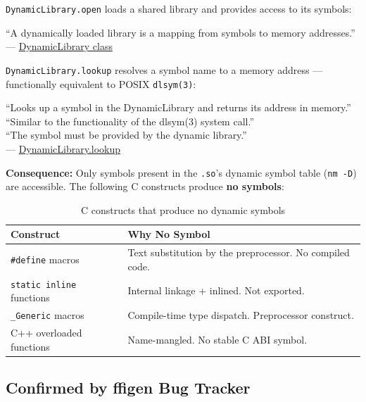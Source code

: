 \documentclass[11pt,a4paper]{article}
\newcommand{\code}[1]{\texttt{#1}}
\begin{document}
\code{DynamicLibrary.open} loads a shared library and provides access to its
symbols:

\begin{quotebox}
``A dynamically loaded library is a mapping from symbols to memory addresses.''\\
--- \href{https://api.dart.dev/stable/latest/dart-ffi/DynamicLibrary-class.html}{DynamicLibrary class}
\end{quotebox}

\code{DynamicLibrary.lookup} resolves a symbol name to a memory address ---
functionally equivalent to POSIX \code{dlsym(3)}:

\begin{quotebox}
``Looks up a symbol in the DynamicLibrary and returns its address in memory.''\\
``Similar to the functionality of the dlsym(3) system call.''\\
``The symbol must be provided by the dynamic library.''\\
--- \href{https://api.dart.dev/stable/latest/dart-ffi/DynamicLibrary/lookup.html}{DynamicLibrary.lookup}
\end{quotebox}

\textbf{Consequence:} Only symbols present in the \code{.so}'s dynamic symbol
table (\code{nm -D}) are accessible. The following C constructs produce
\textbf{no symbols}:

\begin{table}[ht]
\centering
\begin{tabularx}{\textwidth}{lL}
  \toprule
  \textbf{Construct} & \textbf{Why No Symbol} \\
  \midrule
  \code{\#define} macros        & Text substitution by the preprocessor. No compiled code. \\
  \code{static inline} functions & Internal linkage + inlined. Not exported. \\
  \code{\_Generic} macros       & Compile-time type dispatch. Preprocessor construct. \\
  C++ overloaded functions       & Name-mangled. No stable C ABI symbol. \\
  \bottomrule
\end{tabularx}
\caption{C constructs that produce no dynamic symbols}
\label{tab:no-symbols}
\end{table}


\subsection{Confirmed by ffigen Bug Tracker}
\label{sec:ffigen-bugs}
\end{document}
